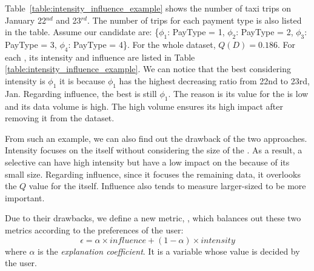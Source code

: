 Table~\ref{table:intensity_influence_example} shows the number of taxi trips on January 22$^{nd}$ and 23$^{rd}$. The number of trips for each payment type is also listed in the table. Assume our candidate {\explanation} are: \{$\phi_1$: PayType = 1, $\phi_2$: PayType = 2, $\phi_3$: PayType = 3, $\phi_4$: PayType = 4\}.
For the whole dataset, $Q(D) = 0.186$. 
For each {\explanation}, its intensity and influence are listed in Table \ref{table:intensity_influence_example}. We can notice that the best {\explanation} considering intensity is $\phi_1$ it is because $\phi_1$ has the highest decreasing ratio from 22nd to 23rd, Jan. Regarding influence, the best {\explanation} is still $\phi_1$. The reason is its value for the {\fact} is low and its data volume is high. The high volume ensures its high impact after removing it from the dataset.

From such an example, we can also find out the drawback of the two approaches. Intensity focuses on the {\explanation} itself without considering the size of the {\explanation}. As a result, a selective {\explanation} can have high intensity but have a low impact on the {\fact} because of its small size. Regarding influence, since it focuses the remaining data, it overlooks the $Q$ value for the {\explanation} itself. Influence also tends to measure larger-sized {\explanation} to be more important. 

Due to their drawbacks, we define a new metric, {\newvalue}, which balances out these two metrics according to the preferences of the user: 
$$\epsilon = \alpha \times influence + (1-\alpha) \times intensity$$
where $\alpha$ is the \textit{explanation coefficient}. It is a variable whose value is decided by the user.

